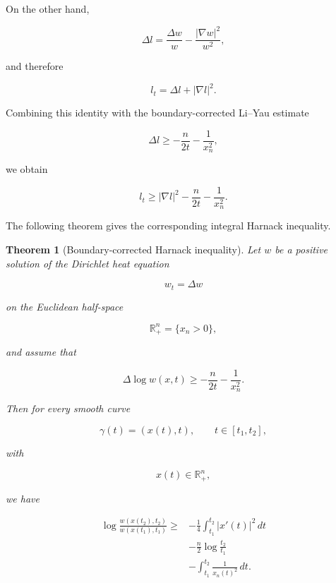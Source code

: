 \documentclass[10pt,a4paper]{amsart}
\newtheorem{theorem}{Theorem}[section]
\begin{document}
On the other hand,

\[
\Delta l
=
\frac{\Delta w}{w}
-
\frac{|\nabla w|^2}{w^2},
\]

and therefore

\[
l_t
=
\Delta l+|\nabla l|^2 .
\]


Combining this identity with the boundary-corrected Li--Yau
estimate

\[
\Delta l
\geq
-\frac n{2t}
-\frac1{x_n^2},
\]

we obtain

\[
l_t
\geq
|\nabla l|^2
-\frac n{2t}
-\frac1{x_n^2}.
\]


The following theorem gives the corresponding integral Harnack
inequality.


\begin{theorem}[Boundary-corrected Harnack inequality]

Let $w$ be a positive solution of the Dirichlet heat equation

\[
w_t=\Delta w
\]

on the Euclidean half-space

\[
\mathbb R^n_+
=
\{x_n>0\},
\]

and assume that

\[
\Delta\log w(x,t)
\geq
-\frac n{2t}
-\frac1{x_n^2}.
\]

Then for every smooth curve

\[
\gamma(t)=(x(t),t),
\qquad
t\in[t_1,t_2],
\]

with

\[
x(t)\in\mathbb R^n_+,
\]

we have

\[
\begin{aligned}
\log
\frac{w(x(t_2),t_2)}
     {w(x(t_1),t_1)}
\geq&
-\frac14
\int_{t_1}^{t_2}
|x'(t)|^2\,dt
\\
&-\frac n2
\log\frac{t_2}{t_1}
\\
&-
\int_{t_1}^{t_2}
\frac1{x_n(t)^2}\,dt .
\end{aligned}
\]

\end{theorem}


\end{document}
